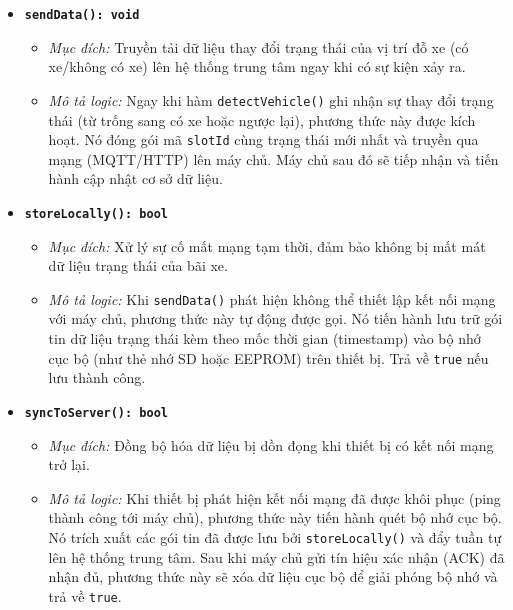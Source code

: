 \begin{itemize}
\begin{itemize}
        \item \textbf{\texttt{sendData(): void}}
        \begin{itemize}
            \item \textit{Mục đích:} Truyền tải dữ liệu thay đổi trạng thái của vị trí đỗ xe (có xe/không có xe) lên hệ thống trung tâm ngay khi có sự kiện xảy ra.
            \item \textit{Mô tả logic:} Ngay khi hàm \texttt{detectVehicle()} ghi nhận sự thay đổi trạng thái (từ trống sang có xe hoặc ngược lại), phương thức này được kích hoạt. Nó đóng gói mã \texttt{slotId} cùng trạng thái mới nhất và truyền qua mạng (MQTT/HTTP) lên máy chủ. Máy chủ sau đó sẽ tiếp nhận và tiến hành cập nhật cơ sở dữ liệu.
        \end{itemize}

        \item \textbf{\texttt{storeLocally(): bool}}
        \begin{itemize}
            \item \textit{Mục đích:} Xử lý sự cố mất mạng tạm thời, đảm bảo không bị mất mát dữ liệu trạng thái của bãi xe.
            \item \textit{Mô tả logic:} Khi \texttt{sendData()} phát hiện không thể thiết lập kết nối mạng với máy chủ, phương thức này tự động được gọi. Nó tiến hành lưu trữ gói tin dữ liệu trạng thái kèm theo mốc thời gian (timestamp) vào bộ nhớ cục bộ (như thẻ nhớ SD hoặc EEPROM) trên thiết bị. Trả về \texttt{true} nếu lưu thành công.
        \end{itemize}

        \item \textbf{\texttt{syncToServer(): bool}}
        \begin{itemize}
            \item \textit{Mục đích:} Đồng bộ hóa dữ liệu bị dồn đọng khi thiết bị có kết nối mạng trở lại.
            \item \textit{Mô tả logic:} Khi thiết bị phát hiện kết nối mạng đã được khôi phục (ping thành công tới máy chủ), phương thức này tiến hành quét bộ nhớ cục bộ. Nó trích xuất các gói tin đã được lưu bởi \texttt{storeLocally()} và đẩy tuần tự lên hệ thống trung tâm. Sau khi máy chủ gửi tín hiệu xác nhận (ACK) đã nhận đủ, phương thức này sẽ xóa dữ liệu cục bộ để giải phóng bộ nhớ và trả về \texttt{true}.
        \end{itemize}
    \end{itemize}
\end{itemize}

